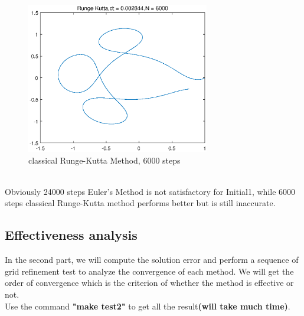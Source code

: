 \documentclass[a4paper,twocolumn]{article}
\theoremstyle{definition}
\begin{document}
\begin{figure}[!htp]   
	\centering
	\includegraphics[width=8cm]{Pictures/1_2.eps}
	\caption{classical Runge-Kutta Method, 6000 steps}
	\label{fig:RK6000}
\end{figure}\\
Obviously 24000 steps Euler's Method is not satisfactory for Initial1, while 6000 steps classical Runge-Kutta method performs better but is still inaccurate.
\newpage
\subsection{Effectiveness analysis}
In the second part, we will compute the solution error and perform a sequence of grid refinement test to analyze the convergence of each method. We will get the order of convergence which is the criterion of whether the method is effective or not.\\
Use the command \textbf{"make test2"} to get all the result\textbf{(will take much time)}.
\end{document}
